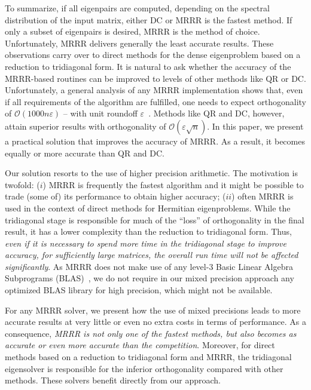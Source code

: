 \documentclass[final]{siamltex}
\newcommand\order[1]{\mathcal{O}(#1)}
\begin{document}
To summarize, if all eigenpairs are computed, depending on the spectral
distribution of the input matrix, either DC or MRRR is the fastest method. If only
a subset of eigenpairs is desired, MRRR is the method of
choice. Unfortunately, MRRR delivers generally the least accurate results.   
These observations carry over to direct methods for the dense
eigenproblem based on a reduction to tridiagonal form. 
It is natural to ask whether the accuracy of the MRRR-based routines can be
improved to levels of other methods like QR or DC. 
Unfortunately, a general analysis of any MRRR implementation shows that, even if all 
requirements of the algorithm are fulfilled, one needs to expect
orthogonality of $\order{1000 n \varepsilon}$ -- with unit roundoff 
$\varepsilon$~\cite{Willems:framework}. Methods like QR and DC, however,
attain superior results with orthogonality of $\order{\varepsilon
  \sqrt{n}}$. In this paper, we present a practical solution that improves the
accuracy of MRRR. As a result, it becomes equally or more accurate than QR and DC.

Our solution resorts to the use of higher precision arithmetic. The motivation is
twofold: ($i$) MRRR is frequently the fastest algorithm and it might be
possible to trade (some of) its performance to obtain higher accuracy; ($ii$)
often MRRR is used in the context of direct methods for Hermitian
eigenproblems. While the tridiagonal stage is responsible for much of 
the ``loss'' of orthogonality in the final result, it has a lower complexity
than the reduction to
tridiagonal form. Thus, {\it even if it is necessary to spend more time in the
tridiagonal stage to improve accuracy, for sufficiently large matrices, the
overall run time will not be affected 
significantly}. As MRRR does not make use of
any level-3 Basic Linear Algebra Subprograms (BLAS)~\cite{blas90}, we do not
require in our mixed precision approach any optimized BLAS library for 
high precision, which might not be available. 

For any MRRR solver, we present how the use of mixed
precisions leads to more accurate results at very little or even no extra
costs in terms of performance. 
As a consequence, {\it MRRR is not only one 
of the fastest methods, but also becomes as accurate or even more accurate than the
competition}. Moreover, for direct methods based on a reduction to
tridiagonal form and MRRR, the tridiagonal eigensolver is responsible for
the inferior orthogonality compared with other methods. These solvers
benefit directly 
from our approach. 
\end{document}
